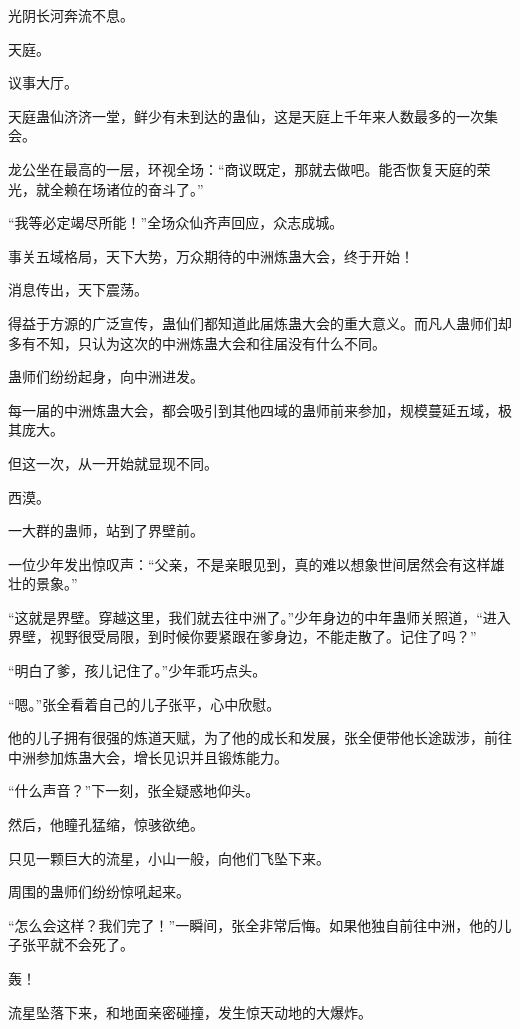 
\begin{this_body}

光阴长河奔流不息。

天庭。

议事大厅。

天庭蛊仙济济一堂，鲜少有未到达的蛊仙，这是天庭上千年来人数最多的一次集会。

龙公坐在最高的一层，环视全场：“商议既定，那就去做吧。能否恢复天庭的荣光，就全赖在场诸位的奋斗了。”

“我等必定竭尽所能！”全场众仙齐声回应，众志成城。

事关五域格局，天下大势，万众期待的中洲炼蛊大会，终于开始！

消息传出，天下震荡。

得益于方源的广泛宣传，蛊仙们都知道此届炼蛊大会的重大意义。而凡人蛊师们却多有不知，只认为这次的中洲炼蛊大会和往届没有什么不同。

蛊师们纷纷起身，向中洲进发。

每一届的中洲炼蛊大会，都会吸引到其他四域的蛊师前来参加，规模蔓延五域，极其庞大。

但这一次，从一开始就显现不同。

西漠。

一大群的蛊师，站到了界壁前。

一位少年发出惊叹声：“父亲，不是亲眼见到，真的难以想象世间居然会有这样雄壮的景象。”

“这就是界壁。穿越这里，我们就去往中洲了。”少年身边的中年蛊师关照道，“进入界壁，视野很受局限，到时候你要紧跟在爹身边，不能走散了。记住了吗？”

“明白了爹，孩儿记住了。”少年乖巧点头。

“嗯。”张全看着自己的儿子张平，心中欣慰。

他的儿子拥有很强的炼道天赋，为了他的成长和发展，张全便带他长途跋涉，前往中洲参加炼蛊大会，增长见识并且锻炼能力。

“什么声音？”下一刻，张全疑惑地仰头。

然后，他瞳孔猛缩，惊骇欲绝。

只见一颗巨大的流星，小山一般，向他们飞坠下来。

周围的蛊师们纷纷惊吼起来。

“怎么会这样？我们完了！”一瞬间，张全非常后悔。如果他独自前往中洲，他的儿子张平就不会死了。

轰！

流星坠落下来，和地面亲密碰撞，发生惊天动地的大爆炸。


\end{this_body}
